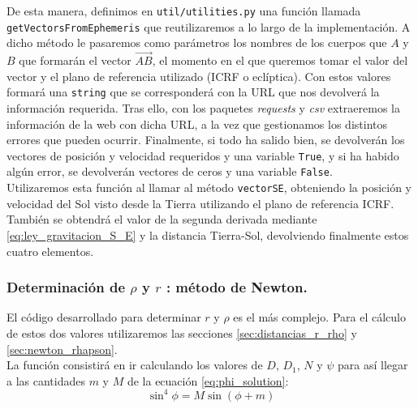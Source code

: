 \documentclass[11pt]{book}
\begin{document}
De esta manera, definimos en \texttt{util/utilities.py} una función llamada \texttt{getVectorsFromEphemeris} que reutilizaremos a lo largo de la implementación. A dicho método le pasaremos como parámetros los nombres de los cuerpos que $A$ y $B$ que formarán el vector $\overrightarrow{AB}$, el momento en el que queremos tomar el valor del vector y el plano de referencia utilizado (ICRF o eclíptica). Con estos valores formará una \texttt{string} que se corresponderá con la URL que nos devolverá la información requerida. Tras ello, con los paquetes \textit{requests} y \textit{csv} extraeremos la información de la web con dicha URL, a la vez que gestionamos los distintos errores que pueden ocurrir. Finalmente, si todo ha salido bien, se devolverán los vectores de posición y velocidad requeridos y una variable \texttt{True}, y si ha habido algún error, se devolverán vectores de ceros y una variable \texttt{False}.\\

Utilizaremos esta función al llamar al método \texttt{vectorSE}, obteniendo la posición y velocidad del Sol visto desde la Tierra utilizando el plano de referencia ICRF. También se obtendrá el valor de la segunda derivada mediante \eqref{eq:ley_gravitacion_S_E} y la distancia Tierra-Sol, devolviendo finalmente estos cuatro elementos.\\

\subsubsection{Determinación de $\rho$ y $r$ : método de Newton.}
El código desarrollado para determinar $r$ y $\rho$ es el más complejo. Para el cálculo de estos dos valores utilizaremos las secciones \ref{sec:distancias_r_rho} y \ref{sec:newton_rhapson}.\\

La función consistirá en ir calculando los valores de $D$, $D_1$, $N$ y $\psi$ para así llegar a las cantidades $m$ y $M$ de la ecuación \eqref{eq:phi_solution}:
\[
\sin^4{\phi}=M\sin{(\phi+m)}
\]
\end{document}
